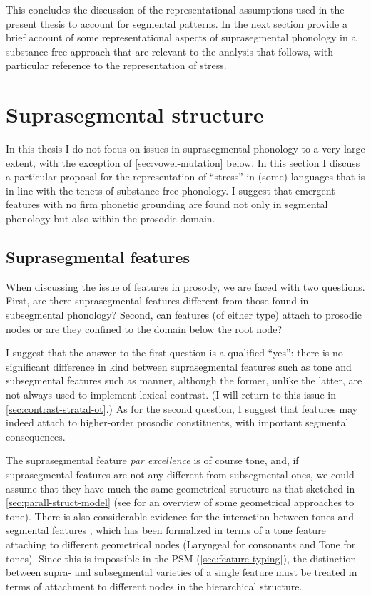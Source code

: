 This concludes the discussion of the representational assumptions used in the present thesis to account for segmental patterns. In the next section provide a brief account of some representational aspects of suprasegmental phonology in a substance\hyp free approach that are relevant to the analysis that follows, with particular reference to the representation of stress.

\section{Suprasegmental structure}
\label{sec:supr-struct}

In this thesis I do not focus on issues in suprasegmental phonology to a very large extent, with the exception of \cref{sec:vowel-mutation} below. In this section I discuss a particular proposal for the representation of \enquote{stress} in (some) languages that is in line with the tenets of substance\hyp free phonology. I suggest that emergent features with no firm phonetic grounding are found not only in segmental phonology but also within the prosodic domain.

\subsection{Suprasegmental features}
\label{sec:supr-feat}

When discussing the issue of features in prosody, we are faced with two questions. First, are there suprasegmental features different from those found in subsegmental phonology? Second, can features (of either type) attach to prosodic nodes or are they confined to the domain below the root node?

I suggest that the answer to the first question is a qualified \enquote{yes}: there is no significant difference in kind between suprasegmental features such as tone and subsegmental features such as manner, although the former, unlike the latter, are not always used to implement lexical contrast. (I will return to this issue in \cref{sec:contrast-stratal-ot}.) As for the second question, I suggest that features may indeed attach to higher\hyp order prosodic constituents, with important segmental consequences.

The suprasegmental feature \emph{par excellence} is of course tone, and, if suprasegmental features are not any different from subsegmental ones, we could assume that they have much the same geometrical structure as that sketched in \cref{sec:parall-struct-model} (see \citealt[§3.4]{yip02:_tone} for an overview of some geometrical approaches to tone). There is also considerable evidence for the interaction between tones and segmental features \citep{hyman74:_univer_tone_rules,hombert78:_conson,jiang-kang99:_tone_optim_theor,bradshaw99,tang08,beckerng:_inter_atr_sloven}, which has been formalized \citep[\eg by][]{bradshaw99} in terms of a tone feature attaching to different geometrical nodes (\eg Laryngeal for consonants and Tone for tones). Since this is impossible in the PSM (\cref{sec:feature-typing}), the distinction between supra- and subsegmental varieties of a single feature must be treated in terms of attachment to different nodes in the hierarchical structure.

